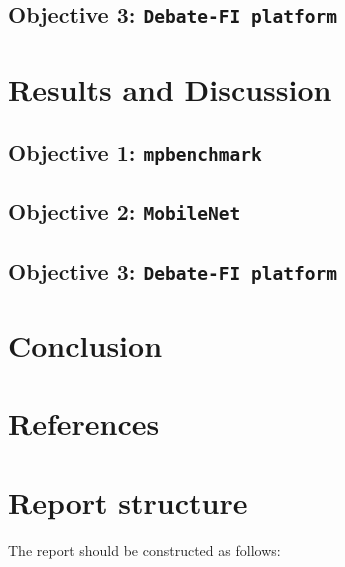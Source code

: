 \documentclass[12pt]{article}
\begin{document}
\subsection{Objective 3: \texttt{Debate-FI platform}}

\section{Results and Discussion}

\subsection{Objective 1: \texttt{mpbenchmark}}
\subsection{Objective 2: \texttt{MobileNet}}
\subsection{Objective 3: \texttt{Debate-FI platform}}

\section{Conclusion}
\section{References}

\hypertarget{report-structure}{%
\section{Report structure}\label{report-structure}}

The report should be constructed as follows:
\end{document}
